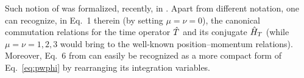 Such notion of  was formalized, recently, in \cite{MacconeGeomEvents}.
Apart from different notation, one can recognize, in Eq.~1 therein
(by setting $\mu = \nu = 0$),
the canonical commutation relations for the time operator $\hat{T}$ and its conjugate $\hat{H}_T$
(while $\mu = \nu = 1, 2, 3$ would bring to the well-known position--momentum relations).
Moreover, Eq.~6 from \cite{MacconeGeomEvents} can easily be recognized as a more compact form of Eq.~\eqref{eq:pwphi}
by rearranging its integration variables.




